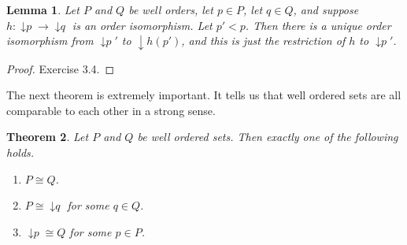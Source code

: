\documentclass{article}
\theoremstyle{plain}
\newtheorem{theorem}{Theorem}[section]{\bfseries}{\itshape}
\newtheorem{lemma}[theorem]{Lemma}{\bfseries}{\upshape}
\DeclareMathOperator{\ISp}{\downarrow \mathit{p}}
\DeclareMathOperator{\ISq}{\downarrow \mathit{q}}
\begin{document}
\begin{lemma}\label{L:isom}
Let $P$ and $Q$ be well orders, let $p\in P$, let $q\in Q$, and suppose $h:\ISp \to \ISq$ is an order isomorphism. Let $p'< p$. Then there is a unique order isomorphism from $\ISp'$ to $\downarrow h(p')$, and this is just the restriction of $h$ to $\ISp'$. 
\end{lemma}
\begin{proof}
Exercise 3.4.
\end{proof}

The next theorem is extremely important. It tells us that well ordered sets are all comparable to each other in a strong sense.

\begin{theorem}\label{T:ordsize}
Let $P$ and $Q$ be well ordered sets. Then exactly one of the following holds.
\begin{enumerate}
\item $P\cong Q$.
\item $P\cong \ISq$ for some $q\in Q$.
\item $\ISp \cong Q$ for some $p\in P$.
\end{enumerate}
\end{theorem}
\end{document}
